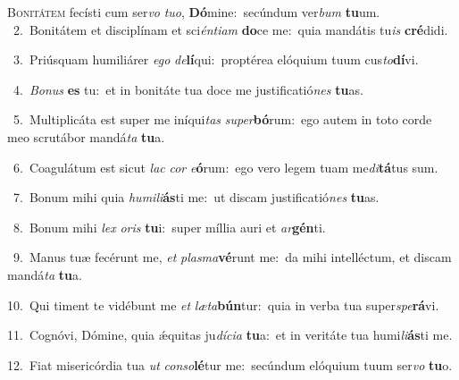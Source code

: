 \lettrine{\initial\textcolor{\initialcolor}{B}}{onitátem} fecísti cum ser\textit{vo} \textit{tu}\-\textit{o}, \textbf{Dó}\-mine:~\star secúndum ver\textit{bum} \textbf{tu}\-um.\\
{\numbfont\textcolor{\numbcolor}{~2.}}~Bonitátem et disciplínam et sci\-\textit{én}\-\textit{ti}\textit{am} \textbf{do}\-ce me:~\star quia mandátis tu\textit{is} \textbf{cré}\-didi.\par
{\numbfont\textcolor{\numbcolor}{~3.}}~Priúsquam humiliárer \textit{e}\-\textit{go} \textit{de}\-\textbf{lí}qui:~\star proptérea elóquium tuum cus\-\textit{to}\-\textbf{dí}vi.\par
{\numbfont\textcolor{\numbcolor}{~4.}}~\-\textit{Bo}\-\textit{nus} \textbf{es} tu:~\star et in bonitáte tua doce me justificatió\textit{nes} \textbf{tu}\-as.\par
{\numbfont\textcolor{\numbcolor}{~5.}}~Multiplicáta est super me iníqui\textit{tas} \textit{su}\-\textit{per}\textbf{bó}rum:~\star ego autem in toto corde meo scrutábor mandá\textit{ta} \textbf{tu}\-a.\par
{\numbfont\textcolor{\numbcolor}{~6.}}~Coagulátum est sicut \textit{lac} \textit{cor} \textit{e}\-\textbf{ó}rum:~\star ego vero legem tuam me\-\textit{di}\-\textbf{tá}tus sum.\par
{\numbfont\textcolor{\numbcolor}{~7.}}~Bonum mihi quia \textit{hu}\-\textit{mi}\textit{li}\textbf{ás}ti me:~\star ut discam justificatió\textit{nes} \textbf{tu}\-as.\par
{\numbfont\textcolor{\numbcolor}{~8.}}~Bonum mihi \textit{lex} \textit{o}\-\textit{ris} \textbf{tu}\-i:~\star super míllia auri et \textit{ar}\-\textbf{gén}ti.\par
{\numbfont\textcolor{\numbcolor}{~9.}}~Manus tuæ fecérunt me, \textit{et} \textit{plas}\-\textit{ma}\textbf{vé}runt me:~\star da mihi intelléctum, et discam mandá\textit{ta} \textbf{tu}\-a.\par
{\numbfont\textcolor{\numbcolor}{10.}}~Qui timent te vidébunt me \textit{et} \textit{læ}\-\textit{ta}\textbf{bún}tur:~\star quia in verba tua super\-\textit{spe}\-\textbf{rá}vi.\par
{\numbfont\textcolor{\numbcolor}{11.}}~Cognóvi, Dómine, quia ǽquitas ju\-\textit{dí}\-\textit{ci}\textit{a} \textbf{tu}\-a:~\star et in veritáte tua humi\-\textit{li}\-\textbf{ás}ti me.\par
{\numbfont\textcolor{\numbcolor}{12.}}~Fiat misericórdia tua \textit{ut} \textit{con}\-\textit{so}\textbf{lé}tur me:~\star secúndum elóquium tuum ser\textit{vo} \textbf{tu}\-o.\par
